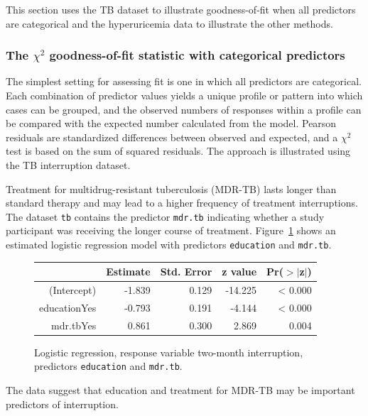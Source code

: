 This section uses the TB dataset to illustrate goodness-of-fit when all predictors are categorical and the hyperuricemia data to illustrate the other methods.

\subsubsection{The $\chi^2$ goodness-of-fit statistic with categorical predictors}

The simplest setting for assessing fit is one in which all predictors are categorical.  Each combination of predictor values yields a unique profile or pattern into which cases can be grouped, and the observed numbers of responses within a profile can be compared with the expected number calculated from the model.  Pearson residuals are standardized differences between observed and expected, and a $\chi^2$ test is based on the sum of squared residuals.  The approach is illustrated using the TB interruption dataset.

Treatment for multidrug-resistant tuberculosis (MDR-TB) lasts longer than standard therapy and may lead to a higher frequency of treatment interruptions.  The dataset \texttt{tb} contains the predictor \texttt{mdr.tb} indicating whether a study participant was receiving the longer course of treatment.  Figure~\ref{treatmentInterruptEducMdrLogreg} shows an estimated logistic regression model with predictors \texttt{education} and \texttt{mdr.tb}.

\begin{figure}[ht]
\centering
\begin{tabular}{rrrrr}
  \hline
 & Estimate & Std. Error & z value & Pr($>$$|$z$|$) \\
  \hline
(Intercept) & -1.839 & 0.129 & -14.225 & < 0.000 \\
  educationYes & -0.793 & 0.191 & -4.144 & < 0.000 \\
  mdr.tbYes & 0.861 & 0.300 & 2.869 & 0.004 \\
   \hline
\end{tabular}
\caption{Logistic regression, response variable two-month interruption,
       predictors \texttt{education} and \texttt{mdr.tb}.}
\label{treatmentInterruptEducMdrLogreg}
\end{figure}
The data suggest that education and treatment for MDR-TB may be important predictors of interruption.

